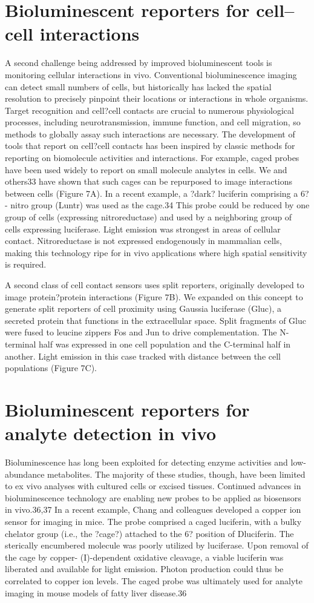 \section{Bioluminescent reporters for cell--cell interactions}
A second challenge being addressed by improved bioluminescent
tools is monitoring cellular interactions in vivo.
Conventional bioluminescence imaging can detect small
numbers of cells, but historically has lacked the spatial
resolution to precisely pinpoint their locations or interactions
in whole organisms. Target recognition and cell?cell contacts
are crucial to numerous physiological processes, including
neurotransmission, immune function, and cell migration, so
methods to globally assay such interactions are necessary.
The development of tools that report on cell?cell contacts
has been inspired by classic methods for reporting on
biomolecule activities and interactions. For example, caged
probes have been used widely to report on small molecule
analytes in cells. We and others33 have shown that such cages
can be repurposed to image interactions between cells (Figure
7A). In a recent example, a ?dark? luciferin comprising a 6?-
nitro group (Luntr) was used as the cage.34 This probe could
be reduced by one group of cells (expressing nitroreductase)
and used by a neighboring group of cells expressing luciferase.
Light emission was strongest in areas of cellular contact.
Nitroreductase is not expressed endogenously in mammalian
cells, making this technology ripe for in vivo applications where
high spatial sensitivity is required.

A second class of cell contact sensors uses split reporters,
originally developed to image protein?protein interactions
(Figure 7B). We expanded on this concept to generate split
reporters of cell proximity using Gaussia luciferase (Gluc), a
secreted protein that functions in the extracellular space. Split
fragments of Gluc were fused to leucine zippers Fos and Jun to
drive complementation. The N-terminal half was expressed in
one cell population and the C-terminal half in another. Light
emission in this case tracked with distance between the cell
populations (Figure 7C).
\section{Bioluminescent reporters for analyte detection in vivo}
Bioluminescence has long been exploited for detecting enzyme
activities and low-abundance metabolites. The majority of these
studies, though, have been limited to ex vivo analyses with
cultured cells or excised tissues. Continued advances in
bioluminescence technology are enabling new probes to be
applied as biosensors in vivo.36,37 In a recent example, Chang
and colleagues developed a copper ion sensor for imaging in
mice. The probe comprised a caged luciferin, with a bulky
chelator group (i.e., the ?cage?) attached to the 6? position of Dluciferin.
The sterically encumbered molecule was poorly
utilized by luciferase. Upon removal of the cage by copper-
(I)-dependent oxidative cleavage, a viable luciferin was liberated
and available for light emission. Photon production could thus
be correlated to copper ion levels. The caged probe was
ultimately used for analyte imaging in mouse models of fatty
liver disease.36
